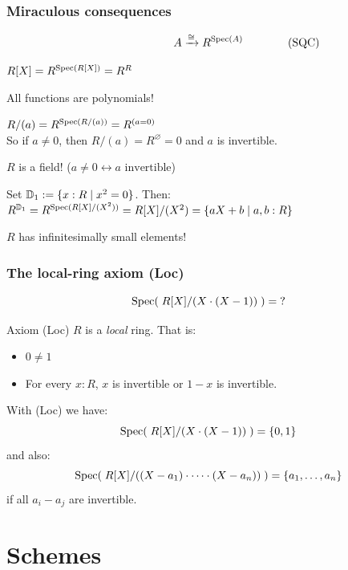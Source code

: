 \documentclass[aspectratio=1610]{beamer}
\begin{document}
\begin{frame}
  \frametitle{Miraculous consequences}

  \[A \xrightarrow{\cong} R^{\Spec(A)} \rlap{\qquad\qquad \text{(SQC)}}\]

  \pause%
  \begin{corollary}
    $R[X] = R^{\operatorname{Spec}(R[X])} = R^R$
  \end{corollary}
  \pause%
  \alert{All functions are polynomials!}

  \pause%
  \begin{corollary}
    $R/(a) = R^{\operatorname{Spec}(R/(a))} = R^{(a = 0)}$\\
    So if $a \neq 0$, then $R/(a) = R^{\varnothing} = 0$ and $a$ is invertible.
  \end{corollary}
  \pause%
  \alert{$R$ is a field! ($a \neq 0 \leftrightarrow \text{$a$ invertible}$)}

  \pause%
  \begin{corollary}
    Set $\mathbb{D}_1 := \{x : R \mid x^2 = 0\}$. Then:\\
    $R^{\mathbb{D}_1} = R^{\operatorname{Spec}(R[X]/(X^2))} = R[X]/(X^2) = \{ aX + b \mid a, b : R \}$
  \end{corollary}
  \pause%
  \alert{$R$ has infinitesimally small elements!}
\end{frame}

\begin{frame}
  \frametitle{The local-ring axiom (Loc)}

  \[ \operatorname{Spec}(\;R[X]/(X\cdot(X-1))\;) = \text{?} \]

  \pause%
  \bigskip
  \begin{block}{Axiom (Loc)}
    $R$ is a \emph{local} ring.
    That is:
    \begin{itemize}
      \item
        $0 \neq 1$
      \item
        For every $x : R$,
        $x$ is invertible or $1 - x$ is invertible.
    \end{itemize}
  \end{block}

  \bigskip
  With (Loc) we have:
  \[ \operatorname{Spec}(\;R[X]/(X\cdot(X-1))\;) = \{0, 1\} \]
  \pause%
  and also:
  \[ \operatorname{Spec}(\;R[X]/((X-a_1)\cdot \dots \cdot(X-a_n))\;) = \{a_1, \dots, a_n\} \]
  if all $a_i - a_j$ are invertible.
\end{frame}

\appendix

\section{Schemes}
\end{document}
